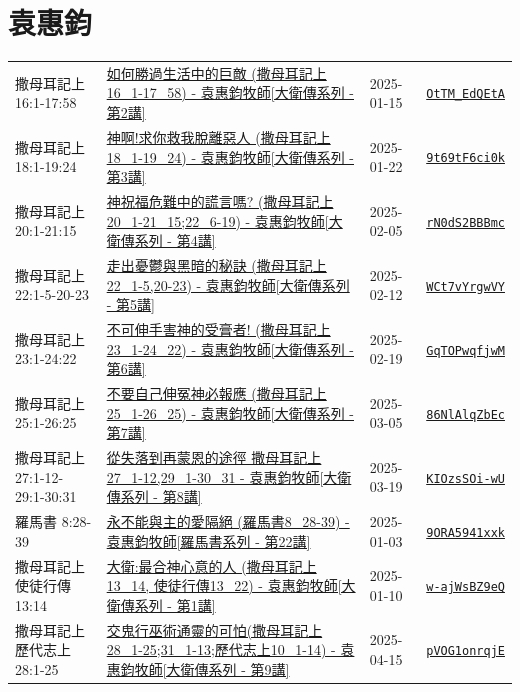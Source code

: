 \documentclass{book}
\begin{document}
\chapter{袁惠鈞}\label{ch:preacher12}
\begin{multicols}{3}
\minitoc
\end{multicols}
{ \scriptsize


\begin{xltabular}{\textwidth}{|p{0.15\textwidth} p{0.6\textwidth}|p{0.07\textwidth} p{0.1\textwidth}|}
\hline
撒母耳記上 16:1-17:58 & \hyperref[sec:OtTM_EdQEtA]{如何勝過生活中的巨敵 (撒母耳記上16\_1-17\_58) - 袁惠鈞牧師[大衛傳系列 - 第2講]} & 2025-01-15 & \href{https://youtube.com/watch?v=OtTM_EdQEtA}{\texttt{OtTM\_EdQEtA}} \\
撒母耳記上 18:1-19:24 & \hyperref[sec:9t69tF6ci0k]{神啊!求你救我脫離惡人 (撒母耳記上18\_1-19\_24) - 袁惠鈞牧師[大衛傳系列 - 第3講]} & 2025-01-22 & \href{https://youtube.com/watch?v=9t69tF6ci0k}{\texttt{9t69tF6ci0k}} \\
撒母耳記上 20:1-21:15 & \hyperref[sec:rN0dS2BBBmc]{神祝福危難中的謊言嗎?  (撒母耳記上20\_1-21\_15;22\_6-19) - 袁惠鈞牧師[大衛傳系列 - 第4講]} & 2025-02-05 & \href{https://youtube.com/watch?v=rN0dS2BBBmc}{\texttt{rN0dS2BBBmc}} \\
撒母耳記上 22:1-5-20-23 & \hyperref[sec:WCt7vYrgwVY]{走出憂鬱與黑暗的秘訣 (撒母耳記上22\_1-5,20-23) - 袁惠鈞牧師[大衛傳系列 - 第5講]} & 2025-02-12 & \href{https://youtube.com/watch?v=WCt7vYrgwVY}{\texttt{WCt7vYrgwVY}} \\
撒母耳記上 23:1-24:22 & \hyperref[sec:GqTOPwqfjwM]{不可伸手害神的受膏者! (撒母耳記上23\_1-24\_22) - 袁惠鈞牧師[大衛傳系列 - 第6講]} & 2025-02-19 & \href{https://youtube.com/watch?v=GqTOPwqfjwM}{\texttt{GqTOPwqfjwM}} \\
撒母耳記上 25:1-26:25 & \hyperref[sec:86NlAlqZbEc]{不要自己伸冤神必報應 (撒母耳記上25\_1-26\_25) - 袁惠鈞牧師[大衛傳系列 - 第7講]} & 2025-03-05 & \href{https://youtube.com/watch?v=86NlAlqZbEc}{\texttt{86NlAlqZbEc}} \\
撒母耳記上 27:1-12-29:1-30:31 & \hyperref[sec:KIOzsSOi_wU]{從失落到再蒙恩的途徑 撒母耳記上27\_1-12,29\_1-30\_31 - 袁惠鈞牧師[大衛傳系列 - 第8講]} & 2025-03-19 & \href{https://youtube.com/watch?v=KIOzsSOi-wU}{\texttt{KIOzsSOi-wU}} \\
羅馬書 8:28-39 & \hyperref[sec:9ORA5941xxk]{永不能與主的愛隔絕 (羅馬書8\_28-39) - 袁惠鈞牧師[羅馬書系列 - 第22講]} & 2025-01-03 & \href{https://youtube.com/watch?v=9ORA5941xxk}{\texttt{9ORA5941xxk}} \\
撒母耳記上使徒行傳 13:14 & \hyperref[sec:w_ajWsBZ9eQ]{大衛:最合神心意的人 (撒母耳記上13\_14, 使徒行傳13\_22) - 袁惠鈞牧師[大衛傳系列 - 第1講]} & 2025-01-10 & \href{https://youtube.com/watch?v=w-ajWsBZ9eQ}{\texttt{w-ajWsBZ9eQ}} \\
撒母耳記上歷代志上 28:1-25 & \hyperref[sec:pVOG1onrqjE]{交鬼行巫術通靈的可怕(撒母耳記上28\_1-25;31\_1-13;歷代志上10\_1-14) - 袁惠鈞牧師[大衛傳系列 - 第9講]} & 2025-04-15 & \href{https://youtube.com/watch?v=pVOG1onrqjE}{\texttt{pVOG1onrqjE}} \\
\hline
\end{xltabular}
}
\newpage
\end{document}
